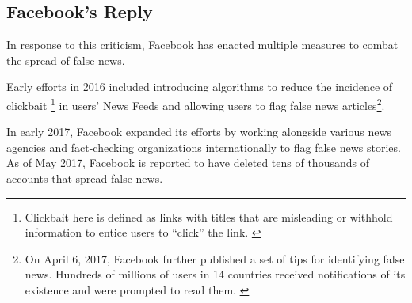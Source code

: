 \subsection{Facebook's Reply}

\par In response to this criticism, Facebook has enacted multiple measures to combat the spread of false news. \cite{fb_newsroom,fb_addressing_hoaxes,guardian_fb_tips,tc_fb_down_ranks_fake_news,tc_facebook_ai,telegraph_fb_delete}

\par Early efforts in 2016 included introducing algorithms to reduce the incidence of clickbait
\footnote{Clickbait here is defined as links with titles that are misleading or withhold information to entice users to ``click'' the link. \cite{fb_addressing_hoaxes}} in users' News Feeds \cite{fb_addressing_hoaxes} and allowing users to flag false news articles\footnote{On April 6, 2017, Facebook further published a set of tips for identifying false news. Hundreds of millions of users in 14 countries received notifications of its existence and were prompted to read them. \cite{guardian_fb_tips}}. \cite{tc_fb_down_ranks_fake_news} 

\par In early 2017, Facebook expanded its efforts by working alongside various news agencies and fact-checking organizations internationally to flag false news stories. \cite{guardian_steps} As of May 2017, Facebook is reported to have deleted tens of thousands of accounts that spread false news. \cite{telegraph_fb_delete}

\vfill